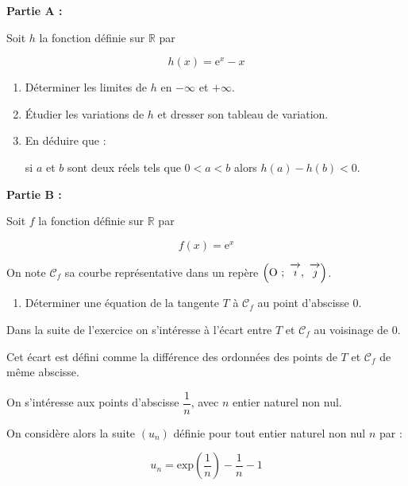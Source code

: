 \documentclass[10pt,a4paper]{article}
\newcommand{\R}{\mathbb{R}}
\newcommand{\vect}[1]{\overrightarrow{\,\mathstrut#1\,}}
\def\Oij{$\left(\text{O}~;~\vect{\imath},~\vect{\jmath}\right)$}
\begin{document}
\bigskip

\textbf{Partie A :}

\medskip

Soit $h$ la fonction définie sur $\R$ par

\[h(x) = \text{e}^x - x\]

\smallskip

\begin{enumerate}
\item Déterminer les limites de $h$ en $-\infty$ et $+\infty$.
\item Étudier les variations de $h$ et dresser son tableau de variation.
\item En déduire que :

si $a$ et $b$ sont deux réels tels que $0 < a < b$ alors $h(a) - h(b) < 0$.
\end{enumerate}

\bigskip

\textbf{Partie B :}

\medskip

Soit $f$ la fonction définie sur $\R$ par

\[f(x) = \text{e}^x\]

On note $\mathcal{C}_f$ sa courbe représentative dans un repère \Oij.

\medskip

\begin{enumerate}
\item Déterminer une équation de la tangente $T$ à $\mathcal{C}_f$ au point d'abscisse 0.
\end{enumerate}

Dans la suite de l'exercice on s'intéresse à l'écart entre $T$ et $\mathcal{C}_f$ au voisinage de $0$.

Cet écart est défini comme la différence des ordonnées des points de $T$ et $\mathcal{C}_f$ de même abscisse.

On s'intéresse aux points d'abscisse $\dfrac{1}{n}$, avec $n$ entier naturel non nul.

On considère alors la suite $\left(u_n\right)$ définie pour tout entier naturel non nul $n$ par : 

\[u_n = \text{exp} \left(\dfrac{1}{n}\right) - \dfrac{1}{n} - 1\]
\end{document}
